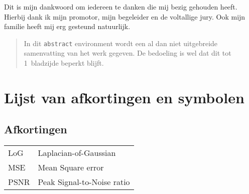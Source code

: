 \documentclass[master=ucll,11pt,dutch,twoside]{kulemt}
\newcommand{\quotes}[1]{``#1''}
\begin{document}
\begin{preface}
  Dit is mijn dankwoord om iedereen te danken die mij bezig gehouden heeft.
  Hierbij dank ik mijn promotor, mijn begeleider en de voltallige jury.
  Ook mijn familie heeft mij erg gesteund natuurlijk.
\end{preface}


\begingroup
\hypersetup{hidelinks}
\tableofcontents*
\endgroup



\begin{abstract}
  In dit \texttt{abstract} environment wordt een al dan niet uitgebreide
  samenvatting van het werk gegeven. De bedoeling is wel dat dit tot
  1~bladzijde beperkt blijft.

  \lipsum[1]

\end{abstract}

\listoffiguresandtables

\chapter{Lijst van afkortingen en symbolen}
\section*{Afkortingen}
\begin{flushleft}
  \renewcommand{\arraystretch}{1.1}
  \begin{tabularx}{\textwidth}{@{}p{12mm}X@{}}
    LoG   & Laplacian-of-Gaussian \\
    MSE   & Mean Square error \\
    PSNR  & Peak Signal-to-Noise ratio \\
  \end{tabularx}
\end{flushleft}
\end{document}
